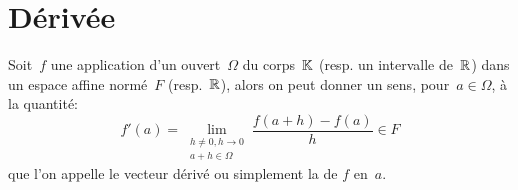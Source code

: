 \section{Dérivée}
\medskip
\begin{definition}
Soit~$f$ une application d'un ouvert~$\Omega$ du corps~$\mathbb K$ (resp. un intervalle de~$\mathbb R$) dans un espace affine normé~$F$ (resp.~$\mathbb R$), alors on peut donner un sens, pour~$a\in\Omega$, à la quantité:
\begin{equation}
f'(a)=\lim_{\substack{h\ne0,h\to0\\a+h\in\Omega}} \dfrac{f(a+h)-f(a)}h \in F
\end{equation}
que l'on appelle le vecteur dérivé ou simplement la  de $f$ en~$a$.
\end{definition}
\medskipvm
